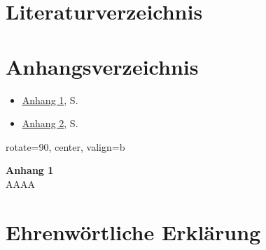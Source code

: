 \documentclass[
    12pt, 
    a4paper,
    ]{scrartcl} %
\begin{document}
\newpage
\section*{Literaturverzeichnis} 

\renewcommand{\refname}{} %
\vspace{-\baselineskip} %

\newpage
\section*{Anhangsverzeichnis}
\vspace{0.6cm}
\begin{itemize}
    \item \hyperref[sec:Anhang1]{Anhang 1}, S. \pageref{sec:Anhang1}
    \item \hyperref[sec:Anhang2]{Anhang 2}, S. \pageref{sec:Anhang2}
\end{itemize}

\appendix
\renewcommand{\thesection}{\Alph{section}}
\newpage
\newpage
{}
{}
\label{sec:Anhang1}

\vspace*{\fill}
\begin{center}
    \begin{adjustbox}{rotate=90, center, valign=b}
        \begin{minipage}{0.9\textheight}
            \centering
            {\Large\bfseries Anhang 1}\\[1em]
            AAAA
        \end{minipage}
    \end{adjustbox}
\end{center}
\vspace*{\fill}

\newpage
\section*{Ehrenwörtliche Erklärung}
\end{document}

